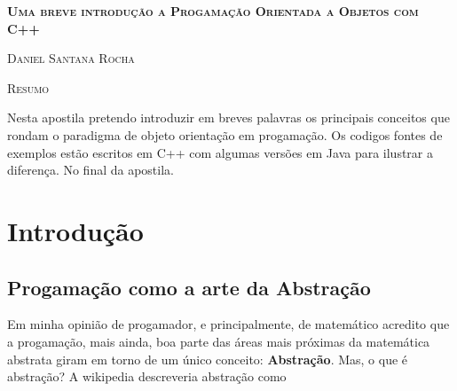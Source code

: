 \documentclass{amsbook}
\let\cleardoublepage\clearpage
\begin{document}
	\begin{centering}
{\scshape\LARGE \textbf {Uma breve introdução a Progamação Orientada a Objetos com C++} \par}
	\vspace{0.5cm}
	{\scshape\large Daniel Santana Rocha\par}
	\vspace{2cm}
	{\scshape\large Resumo\par}
	\vspace{0.4cm}
 {\small Nesta apostila pretendo introduzir em breves palavras os principais conceitos que rondam o paradigma de objeto orientação em progamação. Os codigos fontes de exemplos estão escritos em C++ com algumas versões em Java para ilustrar a diferença. No final da apostila.\par}

	\vspace{1cm}
\begingroup

\let\clearpage\relax
\let\cleardoublepage\relax
\tableofcontents
\endgroup
	\end{centering}

\chapter{Introdução}

\section{Progamação como a arte da Abstração}

	Em minha opinião de progamador, e principalmente, de matemático acredito que a progamação, mais ainda, boa parte das áreas mais próximas da matemática abstrata giram em torno de um único conceito: \textbf{Abstração}. Mas, o que é abstração? A wikipedia descreveria abstração como 
	\newline
	\begin{center}{\newline}\end{center}
\end{document}
